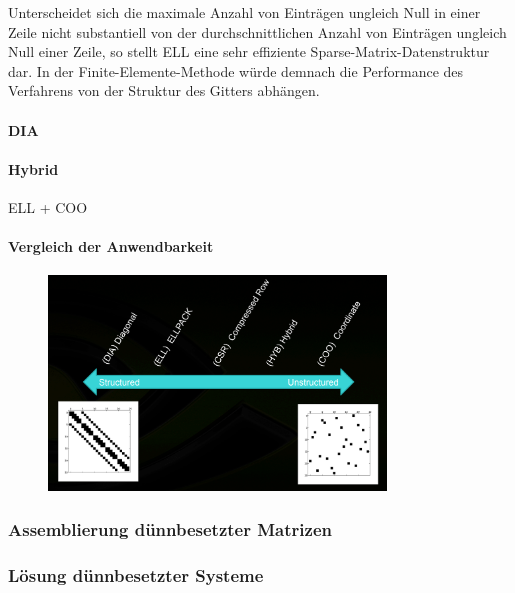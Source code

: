 \documentclass[crop=false]{standalone}
\begin{document}
          Unterscheidet sich die maximale Anzahl von Einträgen ungleich Null in einer Zeile nicht substantiell von der durchschnittlichen Anzahl von Einträgen ungleich Null einer Zeile, so stellt ELL eine sehr effiziente Sparse-Matrix-Datenstruktur dar.
          In der Finite-Elemente-Methode würde demnach die Performance des Verfahrens von der Struktur des Gitters abhängen.
          \cite{Bell2008}

        \paragraph{DIA} %
        \label{par:dia}


        \paragraph{Hybrid} %
        \label{par:hybrid}
          ELL + COO

        \paragraph{Vergleich der Anwendbarkeit} %
        \label{par:vergleich_der_anwendbarkeit}
          \begin{figure}[h]
            \center
            \includegraphics[width=0.8\textwidth]{images/comparison_sparse_matrix_formats.png}
          \end{figure}

      \subsubsection{Assemblierung dünnbesetzter Matrizen} %
      \label{ssub:assemblierung_dünnbesetzter_matrizen}


      \subsubsection{Lösung dünnbesetzter Systeme} %
      \label{ssub:lösung_dünnbesetzter_systeme}
        \cite[S.~101~ff]{Nocedal2006}
\end{document}
